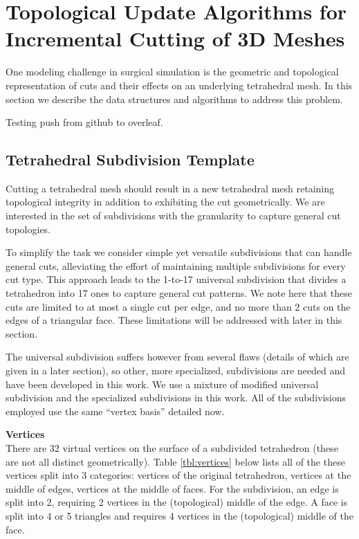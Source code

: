 
\section{Topological Update Algorithms for Incremental Cutting of 3D Meshes}\label{sec:topological_updates}

One modeling challenge in surgical simulation is the geometric and topological representation of cuts and their effects on an underlying tetrahedral mesh. In this section we describe the data structures and algorithms to address this problem. 

Testing push from github to overleaf.

\subsection{Tetrahedral Subdivision Template}

Cutting a tetrahedral mesh should result in a new tetrahedral mesh retaining topological integrity in addition to exhibiting the cut geometrically. We are interested in the set of subdivisions with the granularity to capture general cut topologies.

To simplify the task we consider simple yet versatile subdivisions that can handle general cuts, alleviating the effort of maintaining multiple subdivisions for every cut type. This approach leads to the 1-to-17 universal subdivision \cite{bielser:gm:2004} that divides a tetrahedron into 17 ones to capture general cut patterns.  We note here that these cuts are limited to at most a single cut per edge, and no more than 2 cuts on the edges of a triangular face. These limitations will be addressed with later in this section.

The universal subdivision suffers however from several flaws (details of which are given in a later section), so other, more specialized, subdivisions are needed and have been developed in this work. We use a mixture of modified universal subdivision and the specialized subdivisions in this work. All of the subdivisions employed use the same \enquote{vertex basis} detailed now.

\textbf{Vertices}\\
There are 32 virtual vertices on the surface of a subdivided tetrahedron (these are not all distinct geometrically). Table \ref{tbl:vertices} below lists all of the these vertices split into 3 categories: vertices of the original tetrahedron, vertices at the middle of edges, vertices at the middle of faces. For the subdivision, an edge is split into 2, requiring 2 vertices in the (topological) middle of the edge. A face is split into 4 or 5 triangles and requires 4 vertices in the (topological) middle of the face.


